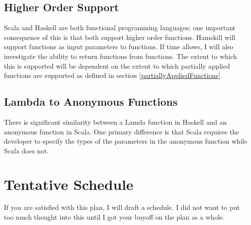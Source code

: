 \documentclass{report}
\begin{document}
\subsection{Higher Order Support}

Scala and Haskell are both functional programming languages; one important consequence of this is that both support higher order functions.  Hamskill will support functions as input parameters to functions.  If time allows, I will also investigate the ability to return functions from functions.  The extent to which this is supported will be dependent on the extent to which partially applied functions are supported as defined in section \ref{partiallyAppliedFunctions}.

\subsection{Lambda to Anonymous Functions}

There is significant similarity between a Lamda function in Haskell and an anonymous function in Scala.  One primary difference is that Scala requires the developer to specify the types of the parameters in the anonymous function while Scala does not.  

\section{Tentative Schedule}

If you are satisfied with this plan, I will draft a schedule.  I did not want to put too much thought into this until I got your buyoff on the plan as a whole.

\pagebreak


\end{document}
